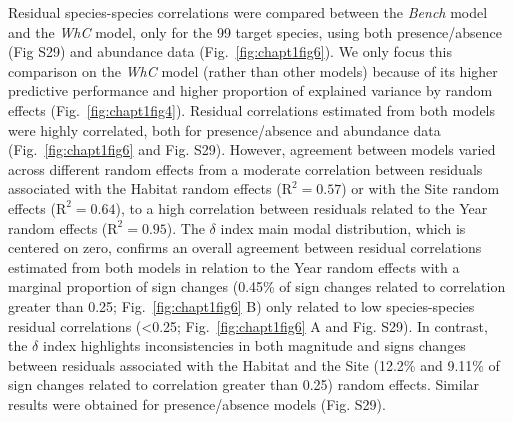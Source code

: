 \begin{refsection}
Residual species-species correlations were compared between the
\emph{Bench} model and the \emph{WhC} model, only for the 99 target
species, using both presence/absence (Fig S29) and abundance data
(Fig.~\ref{fig:chapt1fig6}). We only focus this comparison on the
\emph{WhC} model (rather than other models) because of its higher
predictive performance and higher proportion of explained variance by
random effects (Fig.~\ref{fig:chapt1fig4}). Residual correlations
estimated from both models were highly correlated, both for
presence/absence and abundance data (Fig.~\ref{fig:chapt1fig6} and Fig.
S29). However, agreement between models varied across different random
effects from a moderate correlation between residuals associated with
the Habitat random effects (\(\text{R}^2=0.57\)) or with the Site random
effects (\(\text{R}^2=0.64\)), to a high correlation between residuals
related to the Year random effects (\(\text{R}^2=0.95\)). The \(\delta\)
index main modal distribution, which is centered on zero, confirms an
overall agreement between residual correlations estimated from both
models in relation to the Year random effects with a marginal proportion
of sign changes (0.45\% of sign changes related to correlation greater
than 0.25; Fig.~\ref{fig:chapt1fig6} B) only related to low
species-species residual correlations (\textless0.25;
Fig.~\ref{fig:chapt1fig6} A and Fig. S29). In contrast, the \(\delta\)
index highlights inconsistencies in both magnitude and signs changes
between residuals associated with the Habitat and the Site (12.2\% and
9.11\% of sign changes related to correlation greater than 0.25) random
effects. Similar results were obtained for presence/absence models (Fig.
S29).


\end{refsection}
